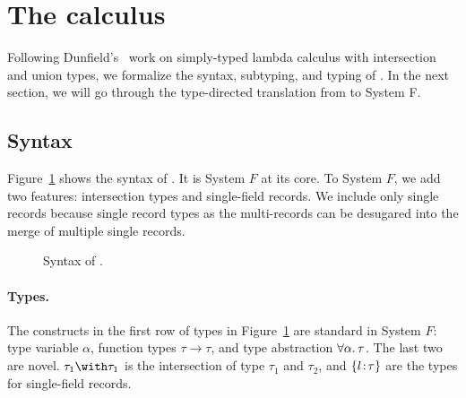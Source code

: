 \section{The \name calculus}



Following Dunfield's~\cite{dunfield2014elaborating} work on simply-typed lambda
calculus with intersection and union types, we formalize the syntax, subtyping,
and typing of \name. In the next section, we will go through the type-directed
translation from \name to System F.



\subsection{Syntax}

Figure~\ref{fig:fi-syntax} shows the syntax of \name. It is System $ F $ at its
core. To System $ F $, we add two features: intersection types and single-field
records.
We include only single records because single record types as the multi-records
can be desugared into the merge of multiple single records.

\begin{figure}
  
  \caption{Syntax of \name.}
  \label{fig:fi-syntax}
\end{figure}

\paragraph{Types.} The constructs in the first row of types in
Figure~\ref{fig:fi-syntax} are standard in System $ F $: type variable
$ \alpha $, function types $ \tau \to \tau $, and type abstraction
$ \forall \alpha. \, \tau $. The last two are novel. $ \tau_1 \andop \tau_1 $ is
the intersection of type $ \tau_1 $ and $ \tau_2 $, 
and $ \{ l \!:\! \tau \} $ are the types for single-field records.

